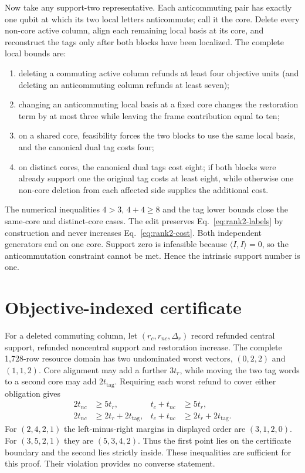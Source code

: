 \documentclass[a4paper,onecolumn,11pt,unpublished,noarxiv]{quantumarticle}
\begin{document}
Now take any support-two representative.  Each anticommuting pair has exactly one qubit at which its two local letters anticommute; call it the core.  Delete every non-core active column, align each remaining local basis at its core, and reconstruct the tags only after both blocks have been localized.  The complete local bounds are:
\begin{enumerate}
\item deleting a commuting active column refunds at least four objective units (and deleting an anticommuting column refunds at least seven);
\item changing an anticommuting local basis at a fixed core changes the restoration term by at most three while leaving the frame contribution equal to ten;
\item on a shared core, feasibility forces the two blocks to use the same local basis, and the canonical dual tag costs four;
\item on distinct cores, the canonical dual tags cost eight; if both blocks were already support one the original tag costs at least eight, while otherwise one non-core deletion from each affected side supplies the additional cost.
\end{enumerate}
The numerical inequalities $4>3$, $4+4\ge8$ and the tag lower bounds close the same-core and distinct-core cases.  The edit preserves Eq.~\eqref{eq:rank2-labels} by construction and never increases Eq.~\eqref{eq:rank2-cost}.  Both independent generators end on one core.  Support zero is infeasible because $\langle I,I\rangle=0$, so the anticommutation constraint cannot be met.  Hence the intrinsic support number is one.

\ProofObligationsTable
\FloatBarrier

\section{Objective-indexed certificate}

For a deleted commuting column, let $(r_c,r_{nc},\Delta_r)$ record refunded central support, refunded noncentral support and restoration increase.  The complete 1,728-row resource domain has two undominated worst vectors, $(0,2,2)$ and $(1,1,2)$.  Core alignment may add a further $3t_r$, while moving the two tag words to a second core may add $2t_{\mathrm{tag}}$.  Requiring each worst refund to cover either obligation gives
\begin{align}
2t_{nc}&\ge5t_r,&t_c+t_{nc}&\ge5t_r,\\
2t_{nc}&\ge2t_r+2t_{\mathrm{tag}},&t_c+t_{nc}&\ge2t_r+2t_{\mathrm{tag}}.
\end{align}
For $(2,4,2,1)$ the left-minus-right margins in displayed order are $(3,1,2,0)$.  For $(3,5,2,1)$ they are $(5,3,4,2)$.  Thus the first point lies on the certificate boundary and the second lies strictly inside.  These inequalities are sufficient for this proof.  Their violation provides no converse statement.
\end{document}

